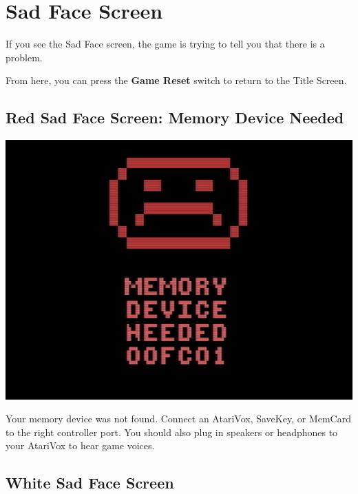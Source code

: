 \documentclass[10pt,twocolumn,openany,article]{memoir}
\begin{document}
\fi

\section*{Sad Face Screen}

If you  see the Sad  Face screen,  the game is  trying to tell  you that
there is a problem.

From here, you can press the \textbf{Game Reset} switch to return to the
Title Screen.

\ifdefined\ATARIAGESAVE\else\ifdefined\NOSAVE\else

\subsection{Red Sad Face Screen: Memory Device Needed}

\includegraphics[width=\columnwidth]{../Manual/RedSadFaceNTSC.png}

Your  memory device  was not  found.  Connect an  AtariVox, SaveKey,  or
MemCard to the  right controller port. You should also  plug in speakers
or headphones to your AtariVox to hear game voices.

\fi\fi

\subsection{White Sad Face Screen}
\end{document}
